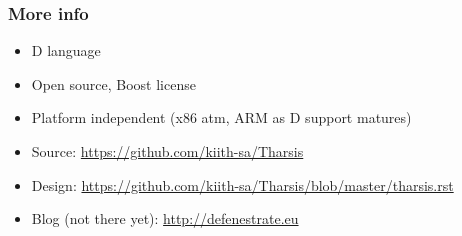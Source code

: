 \documentclass[ignorenonframetext,]{beamer}
\begin{document}
\begin{frame}\frametitle{More info}

\begin{itemize}
\item
  D language
\item
  Open source, Boost license
\item
  Platform independent (x86 atm, ARM as D support matures)
\item
  Source:
  \href{https://github.com/kiith-sa/Tharsis}{https://github.com/kiith-sa/Tharsis}
\item
  Design:
  \href{https://github.com/kiith-sa/Tharsis/blob/master/tharsis.rst}{https://github.com/kiith-sa/Tharsis/blob/master/tharsis.rst}
\item
  Blog (not there yet):
  \href{http://defenestrate.eu}{http://defenestrate.eu}
\end{itemize}

\end{frame}
\end{document}
